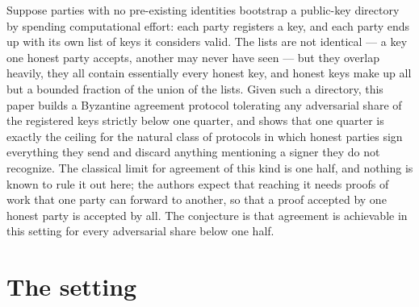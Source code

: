 \documentclass{aicr-conjecture}
\begin{document}

\vspace{0.4em}

\begin{informalconjecture}
Suppose parties with no pre-existing identities bootstrap a public-key
directory by spending computational effort: each party registers a key,
and each party ends up with its own list of keys it considers valid. The
lists are not identical --- a key one honest party accepts, another may
never have seen --- but they overlap heavily, they all contain
essentially every honest key, and honest keys make up all but a bounded
fraction of the union of the lists. Given such a directory, this paper
builds a Byzantine agreement protocol tolerating any adversarial share
of the registered keys strictly below one quarter, and shows that one
quarter is exactly the ceiling for the natural class of protocols in
which honest parties sign everything they send and discard anything
mentioning a signer they do not recognize. The classical limit for
agreement of this kind is one half, and nothing is known to rule it out
here; the authors expect that reaching it needs proofs of work that one
party can forward to another, so that a proof accepted by one honest
party is accepted by all. The conjecture is that agreement is achievable
in this setting for every adversarial share below one half.
\end{informalconjecture}

\section{The setting}\label{sec:setting}
\end{document}
